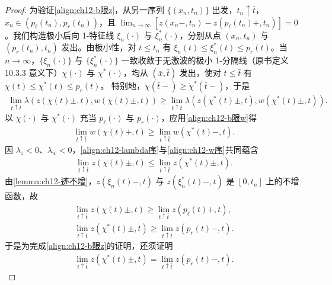 \documentclass[../../main.tex]{subfiles}
\begin{document}
\begin{proof}
为验证\eqref{align:ch12-b限z}，从另一序列 $\{(x_n,t_n)\}$ 出发，$t_n\uparrow\bar t$，$x_n\in(p_\ell(t_n),p_r(t_n))$，且 $\lim_{n\to\infty}[z(x_n-,t_n)-z(p_\ell(t_n)+,t_n)]=0$。我们构造极小后向 1-特征线 $\xi_n(\cdot)$ 与 $\xi_n^*(\cdot)$，分别从点 $(x_n,t_n)$ 与 $(p_r(t_n),t_n)$ 发出。由极小性，对 $t\leqslant t_n$ 有 $\xi_n(t)\leqslant\xi_n^*(t)\leqslant p_r(t)$。当 $n\to\infty$，$\{\xi_n(\cdot)\}$ 与 $\{\xi_n^*(\cdot)\}$ 一致收敛于无激波的极小 1-分隔线（原书定义 10.3.3 意义下）$\chi(\cdot)$ 与 $\chi^*(\cdot)$，均从 $(\bar x,\bar t)$ 发出，使对 $t\leqslant\bar t$ 有 $\chi(t)\leqslant\chi^*(t)\leqslant p_r(t)$。
特别地，$\dot\chi(\bar t-)\geqslant\dot\chi^*(\bar t-)$，于是
\begin{align}
\lim_{t\uparrow\bar t}\lambda(z(\chi(t)\pm,t),w(\chi(t)\pm,t))\geqslant\lim_{t\uparrow\bar t}\lambda(z(\chi^*(t)\pm,t),w(\chi^*(t)\pm,t)).
\label{align:ch12-lambda序}
\end{align}
以 $\chi(\cdot)$ 与 $\chi^*(\cdot)$ 充当 $p_\ell(\cdot)$ 与 $p_r(\cdot)$，应用\eqref{align:ch12-b限w}得
\begin{align}
\lim_{t\uparrow\bar t}w(\chi(t)+,t)\geqslant\lim_{t\uparrow\bar t}w(\chi^*(t)-,t).
\label{align:ch12-w序}
\end{align}
因 $\lambda_z<0$、$\lambda_w<0$，\eqref{align:ch12-lambda序}与\eqref{align:ch12-w序}共同蕴含
\begin{align}
\lim_{t\uparrow\bar t}z(\chi(t)\pm,t)\leqslant\lim_{t\uparrow\bar t}z(\chi^*(t)\pm,t).
\label{align:ch12-z序}
\end{align}
由\cref{lemma:ch12-迹不增}，$z(\xi_n(t)-,t)$ 与 $z(\xi_n^*(t)-,t)$ 是 $[0,t_n]$ 上的不增函数，故
\begin{align}
\lim_{t\uparrow\bar t}z(\chi(t)\pm,t)\geqslant\lim_{t\uparrow\bar t}z(p_\ell(t)+,t),
\label{align:ch12-z序2}\\
\lim_{t\uparrow\bar t}z(\chi^*(t)\pm,t)\geqslant\lim_{t\uparrow\bar t}z(p_r(t)-,t).
\label{align:ch12-z序3}
\end{align}
于是为完成\eqref{align:ch12-b限z}的证明，还须证明
\begin{align}
\lim_{t\uparrow\bar t}z(\chi^*(t)\pm,t)=\lim_{t\uparrow\bar t}z(p_r(t)-,t).
\label{align:ch12-z等式}
\end{align}


\end{proof}
\end{document}
